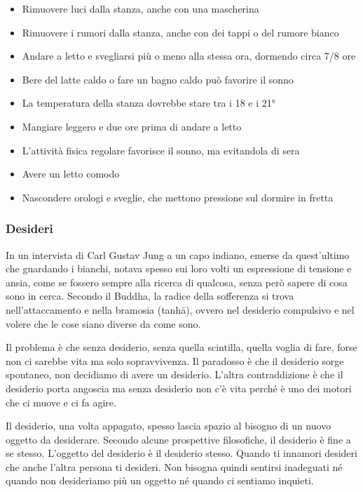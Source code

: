 \documentclass[12pt]{book} %
\begin{document}
\begin{mdframed}[linewidth=1pt]
\begin{itemize}
\item Rimuovere luci dalla stanza, anche con una mascherina
\item Rimuovere i rumori dalla stanza, anche con dei tappi o del rumore bianco
\item Andare a letto e svegliarsi più o meno alla stessa ora, dormendo circa 7/8 ore
\item Bere del latte caldo o fare un bagno caldo può favorire il sonno
\item La temperatura della stanza dovrebbe stare tra i 18 e i 21°
\item Mangiare leggero e due ore prima di andare a letto
\item L'attività fisica regolare favorisce il sonno, ma evitandola di sera
\item Avere un letto comodo 
\item Nascondere orologi e sveglie, che mettono pressione sul dormire in fretta
\end{itemize}
\end{mdframed}

\subsubsection{Desideri}
In un intervista di Carl Gustav Jung a un capo indiano, emerse da quest'ultimo che guardando i
bianchi, notava spesso sui loro volti un espressione di tensione e ansia, come se fossero sempre alla ricerca di
qualcosa, senza però sapere di cosa sono in cerca. Secondo il Buddha, la radice della sofferenza si trova nell’attaccamento e nella bramosia (tanhā), ovvero nel desiderio compulsivo e nel volere che le cose siano diverse da come sono.

Il problema è che senza desiderio, senza quella scintilla, quella voglia di fare, forse non ci sarebbe vita ma solo
sopravvivenza. Il paradosso è che il desiderio sorge spontaneo, non decidiamo di avere
un desiderio. L'altra contraddizione è che il desiderio porta angoscia ma senza desiderio non c'è vita perché è uno dei motori che ci muove e ci fa agire. 

Il desiderio, una volta appagato, spesso lascia spazio al bisogno di un nuovo oggetto da desiderare. Secondo alcune prospettive filosofiche, il desiderio è fine a se stesso.
L'oggetto del desiderio è il desiderio stesso. Quando ti innamori desideri che anche
l'altra persona ti desideri. Non bisogna quindi sentirsi inadeguati né quando non desideriamo più
un oggetto né quando ci sentiamo inquieti.
\end{document}
